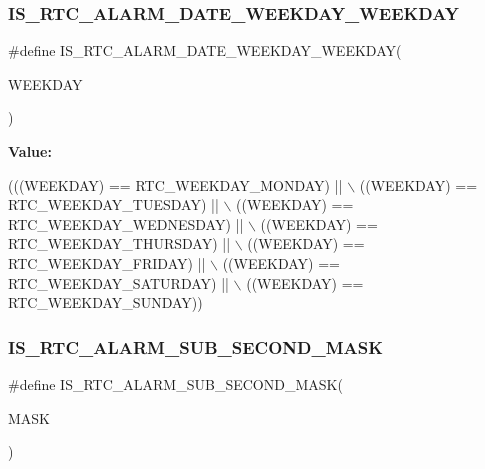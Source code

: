 \subsubsection{\texorpdfstring{I\+S\+\_\+\+R\+T\+C\+\_\+\+A\+L\+A\+R\+M\+\_\+\+D\+A\+T\+E\+\_\+\+W\+E\+E\+K\+D\+A\+Y\+\_\+\+W\+E\+E\+K\+D\+AY}{IS\_RTC\_ALARM\_DATE\_WEEKDAY\_WEEKDAY}}
{\footnotesize\ttfamily \#define I\+S\+\_\+\+R\+T\+C\+\_\+\+A\+L\+A\+R\+M\+\_\+\+D\+A\+T\+E\+\_\+\+W\+E\+E\+K\+D\+A\+Y\+\_\+\+W\+E\+E\+K\+D\+AY(\begin{DoxyParamCaption}\item[{}]{W\+E\+E\+K\+D\+AY }\end{DoxyParamCaption})}

{\bfseries Value\+:}
\begin{DoxyCode}
(((WEEKDAY) == RTC\_WEEKDAY\_MONDAY)    || \(\backslash\)
                                                    ((WEEKDAY) == RTC\_WEEKDAY\_TUESDAY)   || \(\backslash\)
                                                    ((WEEKDAY) == RTC\_WEEKDAY\_WEDNESDAY) || \(\backslash\)
                                                    ((WEEKDAY) == RTC\_WEEKDAY\_THURSDAY)  || \(\backslash\)
                                                    ((WEEKDAY) == RTC\_WEEKDAY\_FRIDAY)    || \(\backslash\)
                                                    ((WEEKDAY) == RTC\_WEEKDAY\_SATURDAY)  || \(\backslash\)
                                                    ((WEEKDAY) == RTC\_WEEKDAY\_SUNDAY))
\end{DoxyCode}
\mbox{\label{group___r_t_c___i_s___r_t_c___definitions_gae6814af31d0cc72b784bc85f63ec4de7}} 
\subsubsection{\texorpdfstring{I\+S\+\_\+\+R\+T\+C\+\_\+\+A\+L\+A\+R\+M\+\_\+\+S\+U\+B\+\_\+\+S\+E\+C\+O\+N\+D\+\_\+\+M\+A\+SK}{IS\_RTC\_ALARM\_SUB\_SECOND\_MASK}}
{\footnotesize\ttfamily \#define I\+S\+\_\+\+R\+T\+C\+\_\+\+A\+L\+A\+R\+M\+\_\+\+S\+U\+B\+\_\+\+S\+E\+C\+O\+N\+D\+\_\+\+M\+A\+SK(\begin{DoxyParamCaption}\item[{}]{M\+A\+SK }\end{DoxyParamCaption})}

